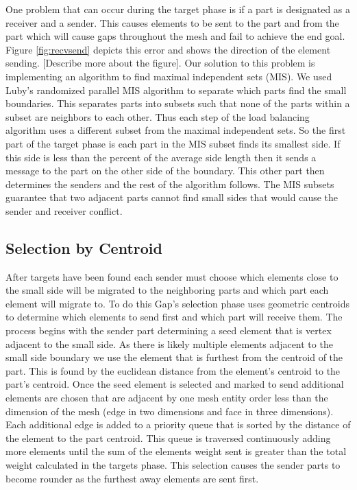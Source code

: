 \documentclass{thesis}
\begin{document}
One problem that can occur during the target phase is if a part is 
designated as a receiver and a sender. This causes elements to be sent 
to the part and from the part which will cause gaps throughout the mesh 
and fail to achieve the end goal. Figure \ref{fig:recvsend} depicts this 
error and shows the direction of the element sending. [Describe more 
about the figure]. Our solution to this problem is implementing an 
algorithm to find maximal independent sets (MIS). We used Luby's randomized 
parallel MIS algorithm \cite{luby} to separate which parts find the small 
boundaries. This separates parts into subsets such that none of the parts 
within a subset are neighbors to each other. Thus each step of the load 
balancing algorithm uses a different subset from the maximal independent 
sets. So the first part of the target phase is each part in the MIS subset 
finds its smallest side. If this side is less than the percent of the average 
side length then it sends a message to the part on the other side of the 
boundary. This other part then determines the senders and the rest of the 
algorithm follows. The MIS subsets guarantee that two adjacent parts cannot 
find small sides that would cause the sender and receiver conflict. 

\subsection{Selection by Centroid}
After targets have been found each sender must choose which elements close to the small side will be migrated to the neighboring parts and which part each element will migrate to. To do this Gap's selection phase uses geometric centroids to determine which elements to send first and which part will receive them. The process begins with the sender part determining a seed element that is vertex adjacent to the small side. As there is likely multiple elements adjacent to the small side boundary we use the element that is furthest from the centroid of the part. This is found by the euclidean distance from the element's centroid to the part's centroid. Once the seed element is selected and marked to send additional elements are chosen that are adjacent by one mesh entity order less than the dimension of the mesh (edge in two dimensions and face in three dimensions). Each additional edge is added to a priority queue that is sorted by the distance of the element to the part centroid. This queue is traversed continuously adding more elements until the sum of the elements weight sent is greater than the total weight calculated in the targets phase. This selection causes the sender parts to become rounder as the furthest away elements are sent first.
\end{document}
